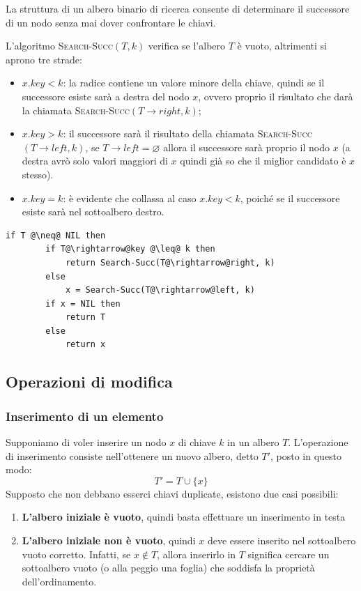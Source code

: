 La struttura di un albero binario di ricerca consente di determinare il successore di un nodo senza mai dover confrontare le chiavi.

L'algoritmo \textsc{Search-Succ}$(T,k)$ verifica se l'albero $T$ è vuoto, altrimenti si aprono tre strade:
\begin{itemize}
	\item $x.key < k$: la radice contiene un valore minore della chiave, quindi se il successore esiste sarà a destra del nodo $x$, ovvero proprio il risultato che darà la chiamata \textsc{Search-Succ}$(T \rightarrow right, k)$;
	\item $x.key > k$: il successore sarà il risultato della chiamata \textsc{Search-Succ}$(T \rightarrow left,k)$, se $T\rightarrow left = \varnothing$ allora il successore sarà proprio il nodo $x$ (a destra avrò solo valori maggiori di $x$ quindi già so che il miglior candidato è $x$ stesso).
	\item $x.key = k$: è evidente che collassa al caso $x.key<k$, poiché se il successore esiste sarà nel sottoalbero destro.
\end{itemize}

\begin{lstlisting}[language=asd,caption={Search-Succ(T,k)},label=lst:search_succ]
	if T @\neq@ NIL then
		if T@\rightarrow@key @\leq@ k then
			return Search-Succ(T@\rightarrow@right, k)
		else
			x = Search-Succ(T@\rightarrow@left, k)
		if x = NIL then
			return T
		else
			return x
\end{lstlisting}

\subsection{Operazioni di modifica}

\subsubsection{Inserimento di un elemento}
Supponiamo di voler inserire un nodo $x$ di chiave $k$ in un albero $T$. L'operazione di inserimento consiste nell'ottenere un nuovo albero, detto $T'$, posto in questo modo:
\begin{displaymath}
T'= T \cup \{x\}
\end{displaymath}
Supposto che non debbano esserci chiavi duplicate, esistono due casi possibili:
\begin{enumerate}
\item \textbf{L'albero iniziale è vuoto}, quindi basta effettuare un inserimento in testa
\item \textbf{L'albero iniziale non è vuoto}, quindi $x$ deve essere inserito nel sottoalbero vuoto corretto. Infatti, se $x \notin T$, allora inserirlo in $T$ significa cercare un sottoalbero vuoto (o alla peggio una foglia) che soddisfa la proprietà dell'ordinamento.
\end{enumerate}

